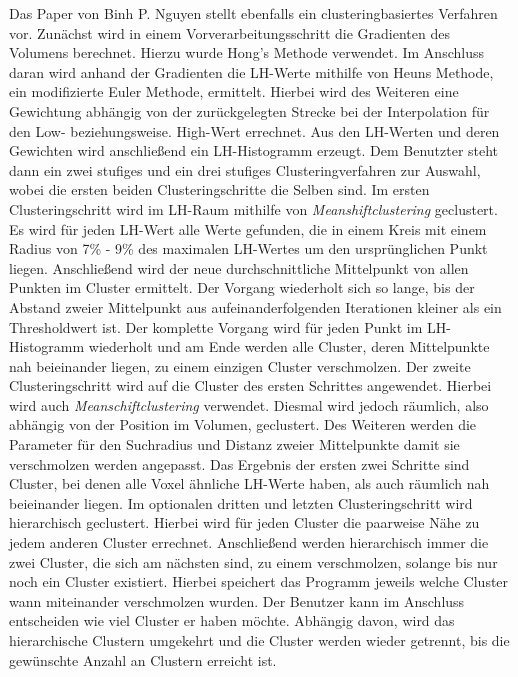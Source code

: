 Das Paper von Binh P. Nguyen \cite{nguyen2012clustering} stellt ebenfalls ein clusteringbasiertes Verfahren vor.
\newline
Zunächst wird in einem Vorverarbeitungsschritt die Gradienten des Volumens berechnet. Hierzu wurde Hong's Methode \cite{hong2003method} verwendet.
\newline
Im Anschluss daran wird anhand der Gradienten die LH-Werte mithilfe von Heuns Methode, ein modifizierte Euler Methode, ermittelt. Hierbei wird des Weiteren eine Gewichtung abhängig von der zurückgelegten Strecke bei der Interpolation für den Low- beziehungsweise. High-Wert errechnet. Aus den LH-Werten und deren Gewichten wird anschließend ein LH-Histogramm erzeugt.
\newline
Dem Benutzter steht dann ein zwei stufiges und ein drei stufiges Clusteringverfahren zur Auswahl, wobei die ersten beiden Clusteringschritte die Selben sind. 
\newline
Im ersten Clusteringschritt wird im LH-Raum mithilfe von \textit{Meanshiftclustering} geclustert. Es wird für jeden LH-Wert alle Werte gefunden, die in einem Kreis mit einem Radius von 7\% - 9\%  des maximalen LH-Wertes um den ursprünglichen Punkt liegen.
\newline
Anschließend wird der neue durchschnittliche Mittelpunkt von allen Punkten im Cluster ermittelt. Der Vorgang wiederholt sich so lange, bis der Abstand zweier Mittelpunkt aus aufeinanderfolgenden Iterationen kleiner als ein Thresholdwert ist.
\newline
Der komplette Vorgang wird für jeden Punkt im LH-Histogramm wiederholt und am Ende werden alle Cluster, deren Mittelpunkte nah beieinander liegen, zu einem einzigen Cluster verschmolzen.
\newline
Der zweite Clusteringschritt wird auf die Cluster des ersten Schrittes angewendet. Hierbei wird auch \textit{Meanschiftclustering} verwendet. Diesmal wird jedoch räumlich, also abhängig von der Position im Volumen, geclustert. Des Weiteren werden die Parameter für den Suchradius und Distanz zweier Mittelpunkte damit sie verschmolzen werden angepasst.
\newline
Das Ergebnis der ersten zwei Schritte sind Cluster, bei denen alle Voxel ähnliche LH-Werte haben, als auch räumlich nah beieinander liegen.
\newline
Im optionalen dritten und letzten Clusteringschritt wird hierarchisch geclustert. Hierbei wird für jeden Cluster die paarweise Nähe zu jedem anderen Cluster errechnet.
\newline
Anschließend werden hierarchisch immer die zwei Cluster, die sich am nächsten sind, zu einem verschmolzen, solange bis nur noch ein Cluster existiert.
\newline
Hierbei speichert das Programm jeweils welche Cluster wann miteinander verschmolzen wurden. Der Benutzer kann im Anschluss entscheiden wie viel Cluster er haben möchte. Abhängig davon, wird das hierarchische Clustern umgekehrt und die Cluster werden wieder getrennt, bis die gewünschte Anzahl an Clustern erreicht ist.


